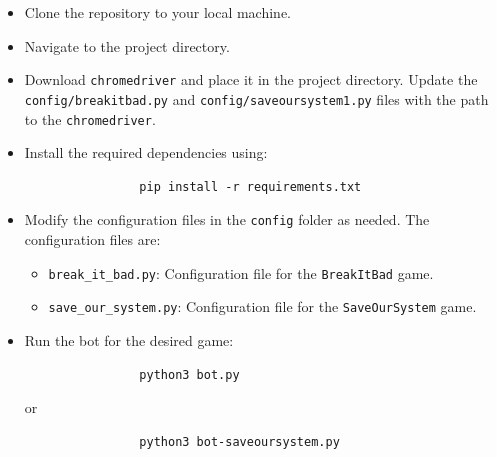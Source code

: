 \documentclass[12pt,a4paper]{report}
\begin{document}
        \begin{itemize}
            \item Clone the repository to your local machine.
            \item Navigate to the project directory.
            \item Download \texttt{chromedriver} and place it in the project directory. Update the \\ \texttt{config/breakitbad.py} and \texttt{config/saveoursystem1.py} files with the path to the \texttt{chromedriver}.
            \item Install the required dependencies using:
            \begin{verbatim}
                pip install -r requirements.txt
            \end{verbatim}
            \item Modify the configuration files in the \texttt{config} folder as needed. The configuration files are:
            \begin{itemize}
                \item \texttt{break\_it\_bad.py}: Configuration file for the \texttt{BreakItBad} game.
                \item \texttt{save\_our\_system.py}: Configuration file for the \texttt{SaveOurSystem} game.
            \end{itemize}
            \item Run the bot for the desired game:
            \begin{verbatim}
                python3 bot.py
            \end{verbatim}
            or
            \begin{verbatim}
                python3 bot-saveoursystem.py
            \end{verbatim}
        \end{itemize}
        
\end{document}
